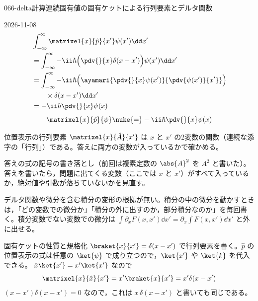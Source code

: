 \documentclass[uplatex,dvipdfmx,a4paper,11pt]{jsarticle}
\begin{document}
\begin{mondai}{066-delta}{計算}{連続固有値の固有ケットによる行列要素とデルタ関数}
\begin{kotaeutsushi}{2026-11-08}
\begin{align*}
&\int_{-\infty}^{\infty}\matrixel{x}{\hat{p}}{x'}\psi(x')\dd x'\\
&=\int_{-\infty}^{\infty}-\ii\hbar\Bigl(\pdv{}{x}\delta(x-x')\Bigr)\psi(x')\dd x'\\
&=\int_{-\infty}^{\infty}-\ii\hbar\Bigl(\ayamari{\pdv{}{x}\psi(x')}{\pdv{\psi(x')}{x'}}\Bigr)\\
&\qquad\times\delta(x-x')\dd x'\\
&=-\ii\hbar\pdv{}{x}\psi(x)
\end{align*}
\[ \matrixel{x}{\hat{p}}{\psi}\nuke{=}-\ii\hbar\pdv{}{x}\psi(x) \]
\end{kotaeutsushi}
\begin{kizuki}
\item 位置表示の行列要素 $\matrixel{x}{\hat{A}}{x'}$ は $x$ と $x'$ の2変数の関数（連続な添字の「行列」）である。答えに両方の変数が入っているかで確かめる。
\item {} 答えの式の記号の書き落とし（前回は複素定数の $\abs{A}^{2}$ を $A^{2}$ と書いた）。答えを書いたら，問題に出てくる変数（ここでは $x$ と $x'$）がすべて入っているか，絶対値や引数が落ちていないかを見直す。
\item {} デルタ関数や微分を含む積分の変形の根拠が無い。積分の中の微分を動かすときは，「どの変数での微分か」「積分の外に出すのか，部分積分なのか」を毎回書く。積分変数でない変数での微分は $\int\partial_{x}F(x,x')\dd x'=\partial_{x}\int F(x,x')\dd x'$ と外に出せる。
\end{kizuki}
\begin{tadashii}
\houshin 固有ケットの性質と規格化 $\braket{x}{x'}=\delta(x-x')$ で行列要素を書く。$\hat{p}$ の位置表示の式は任意の $\ket{\psi}$ で成り立つので，$\ket{x'}$ や $\ket{k}$ を代入できる。
\keisan {} $\hat{x}\ket{x'}=x'\ket{x'}$ なので
\[ \matrixel{x}{\hat{x}}{x'}=x'\braket{x}{x'}=x'\delta(x-x') \]
$(x-x')\delta(x-x')=0$ なので，これは $x\,\delta(x-x')$ と書いても同じである。


\end{tadashii}
\end{mondai}
\end{document}
